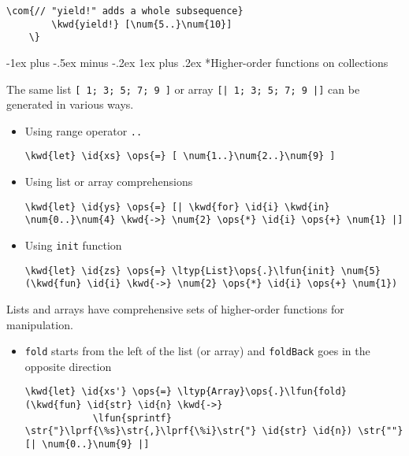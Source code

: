 \documentclass[10pt,landscape]{article}
\makeatletter
\renewcommand{\subsubsection}{\@startsection{subsubsection}{3}{0mm}%
                                {-1ex plus -.5ex minus -.2ex}%
                                {1ex plus .2ex}%
                                {\normalfont\small\bfseries}}
\newcommand{\id}[1]{\textcolor[HTML]{000000}{#1}}
\newcommand{\str}[1]{\textcolor[HTML]{A31515}{#1}}
\newcommand{\kwd}[1]{\textcolor[HTML]{0000FF}{#1}}
\newcommand{\com}[1]{\textcolor[HTML]{008000}{#1}}
\newcommand{\ops}[1]{\textcolor[HTML]{000000}{#1}}
\newcommand{\num}[1]{\textcolor[HTML]{000000}{#1}}
\newcommand{\ltyp}[1]{\textcolor[HTML]{2B91AF}{#1}}
\newcommand{\lfun}[1]{\textcolor[HTML]{0000A0}{#1}}
\newcommand{\lprf}[1]{\textcolor[HTML]{2B91AF}{#1}}
\makeatother
\begin{document}
\begin{multicols}{3}
\begin{Verbatim}[commandchars=\\\{\}]
        \com{// "yield!" adds a whole subsequence}
        \kwd{yield!} [\num{5..}\num{10}]
    \}

\end{Verbatim}

\subsubsection*{Higher-order functions on collections}



The same list \texttt{[ 1; 3; 5; 7; 9 ]} or array \texttt{[| 1; 3; 5; 7; 9 |]} can be generated in various ways.
\begin{itemize}
\item 

Using range operator \texttt{..}
\begin{Verbatim}[commandchars=\\\{\}]
 \kwd{let} \id{xs} \ops{=} [ \num{1..}\num{2..}\num{9} ]
\end{Verbatim}


\item 

Using list or array comprehensions
\begin{Verbatim}[commandchars=\\\{\}]
 \kwd{let} \id{ys} \ops{=} [| \kwd{for} \id{i} \kwd{in} \num{0..}\num{4} \kwd{->} \num{2} \ops{*} \id{i} \ops{+} \num{1} |]
\end{Verbatim}


\item 

Using \texttt{init} function
\begin{Verbatim}[commandchars=\\\{\}]
 \kwd{let} \id{zs} \ops{=} \ltyp{List}\ops{.}\lfun{init} \num{5} (\kwd{fun} \id{i} \kwd{->} \num{2} \ops{*} \id{i} \ops{+} \num{1})
\end{Verbatim}


\end{itemize}



Lists and arrays have comprehensive sets of higher-order functions for manipulation.
\begin{itemize}
\item 

\texttt{fold} starts from the left of the list (or array) and \texttt{foldBack} goes in the opposite direction
\begin{Verbatim}[commandchars=\\\{\}]
\kwd{let} \id{xs'} \ops{=} \ltyp{Array}\ops{.}\lfun{fold} (\kwd{fun} \id{str} \id{n} \kwd{->} 
            \lfun{sprintf} \str{"}\lprf{\%s}\str{,}\lprf{\%i}\str{"} \id{str} \id{n}) \str{""} [| \num{0..}\num{9} |]
\end{Verbatim}



\end{itemize}
\end{multicols}
\end{document}
